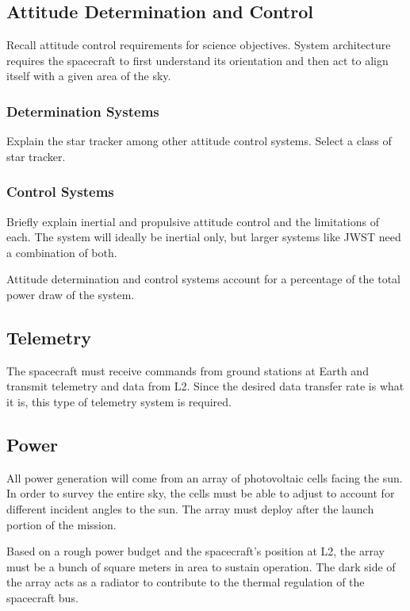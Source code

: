 \documentclass{ws-jai}
\begin{document}
\subsection{Attitude Determination and Control}
\label{sS:adcs}
Recall attitude control requirements for science objectives. System architecture requires the spacecraft to first understand its orientation and then act to align itself with a given area of the sky.

\subsubsection{Determination Systems}
\label{ssS:determination}
Explain the star tracker among other attitude control systems. Select a class of star tracker.

\subsubsection{Control Systems}
\label{ssS:control}
Briefly explain inertial and propulsive attitude control and the limitations of each. The system will ideally be inertial only, but larger systems like JWST need a combination of both.

Attitude determination and control systems account for a percentage of the total power draw of the system.

\subsection{Telemetry}
\label{sS:telemetry}
The spacecraft must receive commands from ground stations at Earth and transmit telemetry and data from L2. Since the desired data transfer rate is what it is, this type of telemetry system is required.

\subsection{Power}
\label{sS:power}
All power generation will come from an array of photovoltaic cells facing the sun. In order to survey the entire sky, the cells must be able to adjust to account for different incident angles to the sun. The array must deploy after the launch portion of the mission.

Based on a rough power budget and the spacecraft's position at L2, the array must be a bunch of square meters in area to sustain operation. The dark side of the array acts as a radiator to contribute to the thermal regulation of the spacecraft bus.
\end{document}
